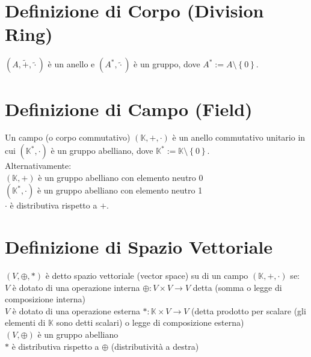 \documentclass[a4paper, twoside, italian, 11pt]{book}
\newcommand{\braces}[1] {\left\{#1\right\}}
\newcommand{\K}{\mathbb{K}}
\begin{document}
\section{Definizione di Corpo (Division Ring)}

$(A, \tilde{+}, \tilde{\cdot})$ è un anello e $(A^*, \tilde{\cdot})$ è un gruppo, dove $A^* := A \setminus \braces{0}$. \\



\section{Definizione di Campo (Field)}

Un campo (o corpo commutativo) $(\K, +, \cdot)$ è un anello commutativo unitario in cui $(\K^*, \cdot)$ è un gruppo abelliano, dove $\K^* := \K \setminus \braces{0}$. \\

\noindent
Alternativamente: \\

$(\K, +)$ è un gruppo abelliano con elemento neutro 0 \\
\indent
$(\K^*, \cdot)$ è un gruppo abelliano con elemento neutro 1 \\
\indent
$\cdot$ è distributiva rispetto a $+$.





\section{Definizione di Spazio Vettoriale}

$(V, \oplus, *)$ è detto spazio vettoriale (vector space) su di un campo $(\K, +, \cdot)$ se: \\

\noindent
$V$ è dotato di una operazione interna $\oplus : V \times V \rightarrow V$ detta (somma o legge di composizione interna) \\

\noindent
$V$ è dotato di una operazione esterna $* : \K \times V \rightarrow V$ (detta prodotto per scalare (gli elementi di $\K$ sono detti scalari) o legge di composizione esterna) \\

\noindent
$(V, \oplus)$ è un gruppo abelliano \\

\noindent
$*$ è distributiva rispetto a $\oplus$ (distributività a destra) \\
\end{document}
